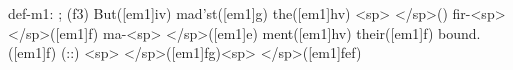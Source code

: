 def-m1: \grealign;
(f3) But([em1]iv) mad'st([em1]g) the([em1]hv) <sp> </sp>() fir-<sp> </sp>([em1]f) ma-<sp> </sp>([em1]e) ment([em1]hv) their([em1]f) bound.([em1]f) (::) <sp> </sp>([em1]fg)<sp>   </sp>([em1]fef)